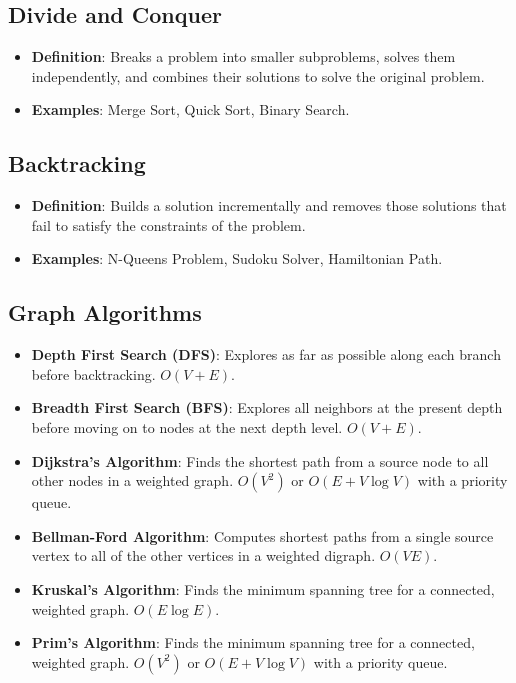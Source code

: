 \documentclass{article}
\begin{document}
\subsection{Divide and Conquer}
\begin{itemize}
    \item \textbf{Definition}: Breaks a problem into smaller subproblems, solves them independently, and combines their solutions to solve the original problem.
    \item \textbf{Examples}: Merge Sort, Quick Sort, Binary Search.
\end{itemize}

\subsection{Backtracking}
\begin{itemize}
    \item \textbf{Definition}: Builds a solution incrementally and removes those solutions that fail to satisfy the constraints of the problem.
    \item \textbf{Examples}: N-Queens Problem, Sudoku Solver, Hamiltonian Path.
\end{itemize}

\subsection{Graph Algorithms}
\begin{itemize}
    \item \textbf{Depth First Search (DFS)}: Explores as far as possible along each branch before backtracking. $O(V + E)$.
    \item \textbf{Breadth First Search (BFS)}: Explores all neighbors at the present depth before moving on to nodes at the next depth level. $O(V + E)$.
    \item \textbf{Dijkstra’s Algorithm}: Finds the shortest path from a source node to all other nodes in a weighted graph. $O(V^2)$ or $O(E + V \log V)$ with a priority queue.
    \item \textbf{Bellman-Ford Algorithm}: Computes shortest paths from a single source vertex to all of the other vertices in a weighted digraph. $O(VE)$.
    \item \textbf{Kruskal’s Algorithm}: Finds the minimum spanning tree for a connected, weighted graph. $O(E \log E)$.
    \item \textbf{Prim’s Algorithm}: Finds the minimum spanning tree for a connected, weighted graph. $O(V^2)$ or $O(E + V \log V)$ with a priority queue.
\end{itemize}
\end{document}
